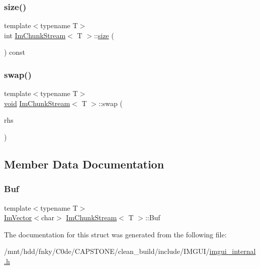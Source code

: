 \mbox{\label{structImChunkStream_a0454c7345104dad27a52828584765edb}} 
\subsubsection{\texorpdfstring{size()}{size()}}
{\footnotesize\ttfamily template$<$typename T$>$ \\
int \hyperlink{structImChunkStream}{Im\+Chunk\+Stream}$<$ T $>$\+::\hyperlink{imgui__impl__opengl3__loader_8h_a3d1e3edfcf61ca2d831883e1afbad89e}{size} (\begin{DoxyParamCaption}{ }\end{DoxyParamCaption}) const\hspace{0.3cm}{\ttfamily [inline]}}

\mbox{\label{structImChunkStream_adbd734ea08939c0bce519e90b26c9d28}} 
\subsubsection{\texorpdfstring{swap()}{swap()}}
{\footnotesize\ttfamily template$<$typename T$>$ \\
\hyperlink{imgui__impl__opengl3__loader_8h_ac668e7cffd9e2e9cfee428b9b2f34fa7}{void} \hyperlink{structImChunkStream}{Im\+Chunk\+Stream}$<$ T $>$\+::swap (\begin{DoxyParamCaption}\item[{\hyperlink{structImChunkStream}{Im\+Chunk\+Stream}$<$ T $>$ \&}]{rhs }\end{DoxyParamCaption})\hspace{0.3cm}{\ttfamily [inline]}}



\subsection{Member Data Documentation}
\mbox{\label{structImChunkStream_ac6036044bd7eae552342b430527cc620}} 
\subsubsection{\texorpdfstring{Buf}{Buf}}
{\footnotesize\ttfamily template$<$typename T$>$ \\
\hyperlink{structImVector}{Im\+Vector}$<$char$>$ \hyperlink{structImChunkStream}{Im\+Chunk\+Stream}$<$ T $>$\+::Buf}



The documentation for this struct was generated from the following file\+:\begin{DoxyCompactItemize}
\item 
/mnt/hdd/fnky/\+C0de/\+C\+A\+P\+S\+T\+O\+N\+E/clean\+\_\+build/include/\+I\+M\+G\+U\+I/\hyperlink{imgui__internal_8h}{imgui\+\_\+internal.\+h}\end{DoxyCompactItemize}
